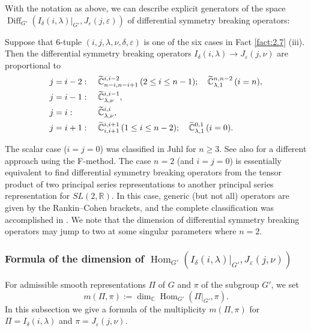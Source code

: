With the notation as above,
 we can describe explicit generators
 of the space ${\operatorname{Diff}}_{G'}(I_{\delta}(i,\lambda)|_{G'}, J_{\varepsilon}(j,\varepsilon))$
 of differential symmetry breaking operators:
\begin{fact}
\label{fact:3.9}
Suppose that 6-tuple $(i,j,\lambda,\nu, \delta, \varepsilon)$ is 
 one of the six cases
 in Fact \ref{fact:2.7} (iii).  
Then the differential symmetry breaking operators
 $I_{\delta}(i,\lambda) \to J_{\varepsilon}(j,\nu)$
 are proportional to 
\begin{alignat*}{2}
&j=i-2:\,\,&& \widetilde{{\mathbb{C}}}_{{n-i},{n-i+1}}^{{i,i-2}} \, (2 \le i \le n-1);
              \quad
              \widetilde{{\mathbb{C}}}_{{\lambda},{1}}^{{n,n-2}} \, (i=n), 
\\
&j=i-1:&&  \widetilde{{\mathbb{C}}}_{{\lambda},{\nu}}^{{i,i-1}}, 
\\
&j=i:&& \widetilde{{\mathbb{C}}}_{{\lambda},{\nu}}^{{i,i}}, 
\\
&j=i+1:&& \widetilde{{\mathbb{C}}}_{{i},{i+1}}^{{i,i+1}} \, (1 \le i \le n-2);
          \quad
          \widetilde{{\mathbb{C}}}_{{\lambda},{1}}^{{0,1}} \, (i=0).  
\end{alignat*}
\end{fact}
\begin{remark}
The scalar case ($i=j=0$)
 was classified
 in Juhl \cite{Juhl} for $n \ge 3$.  
See also \cite{KOSS}
 for a different approach 
 using the 
F-method.  
The case $n=2$ (and $i=j=0$)
 is essentially equivalent to find 
 differential symmetry breaking operators from 
 the tensor product of two principal series representations
 to another principal series representation 
 for $SL(2,{\mathbb{R}})$.  
In this case,
 generic (but not all) operators are given
 by the 
Rankin--Cohen brackets, 
 and the complete classification
 was accomplished in \cite[Thms.~9.1 and 9.2]{KP2}.  
We note
 that the dimension of differential symmetry breaking operators
 may jump to two 
 at some singular parameters
 where $n=2$.  
\end{remark}



\subsubsection{Formula
 of the dimension of 
$
   {\operatorname{Hom}}_{G'}
   (I_{\delta}(i,\lambda)|_{G'},J_{\varepsilon}(j,\nu))
$}
For admissible smooth representations $\Pi$ of $G$
 and $\pi$ of the subgroup $G'$, 
 we set
\[
   m(\Pi, \pi) := \dim_{\mathbb{C}} {\operatorname{Hom}}_{G'}
                               (\Pi|_{G'}, \pi).  
\]
In this subsection
 we give a formula of the multiplicity $m(\Pi, \pi)$
 for $\Pi=I_{\delta}(i,\lambda)$
 and $\pi=J_{\varepsilon}(j,\nu)$.  



